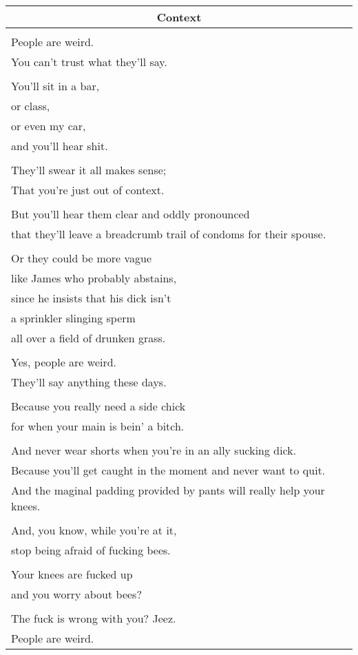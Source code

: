 \documentclass{article}
\begin{document}
\begin{center}
\begin{tabular}{l}
\multicolumn{1}{c}{\textbf{Context}} \\ \hline
\\
People are weird. \\
You can't trust what they'll say. \\
\\
You'll sit in a bar, \\
or class, \\
or even my car, \\
and you'll hear shit. \\
\\
They'll swear it all makes sense; \\
That you're just out of context. \\
\\
But you'll hear them clear and oddly pronounced \\
that they'll leave a breadcrumb trail of condoms for their spouse. \\
\\
Or they could be more vague \\
like James who probably abstains, \\
since he insists that his dick isn't \\
a sprinkler slinging sperm \\
all over a field of drunken grass. \\
\\
Yes, people are weird. \\
They'll say anything these days. \\
\\
Because you really need a side chick \\
for when your main is bein' a bitch. \\
\\
And never wear shorts when you're in an ally sucking dick. \\
Because you'll get caught in the moment and never want to quit. \\
And the maginal padding provided by pants will really help your knees. \\
\\
And, you know, while you're at it, \\
stop being afraid of fucking bees. \\
\\
Your knees are fucked up \\
and you worry about bees? \\
\\
The fuck is wrong with you? Jeez. \\
People are weird. \\
\end{tabular}
\end{center}
\end{document}
